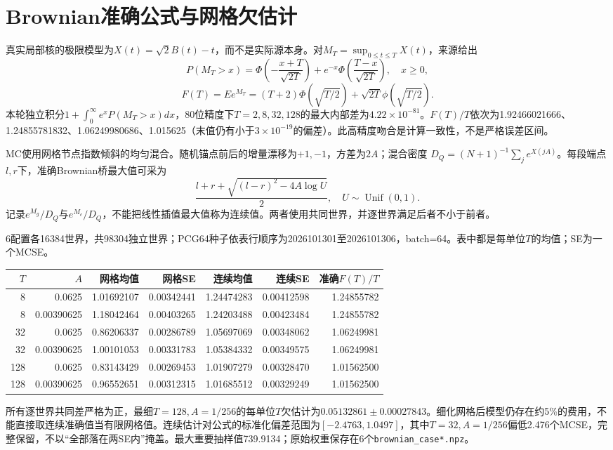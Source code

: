 \documentclass[UTF8,a4paper,11pt,fontset=none]{ctexart}
\begin{document}
\section{Brownian准确公式与网格欠估计}
真实局部核的极限模型为\(X(t)=\sqrt2B(t)-t\)，而不是实际源本身。对\(M_T=\sup_{0\le t\le T}X(t)\)，来源给出
\[
P(M_T>x)=\Phi\!\left(-\frac{x+T}{\sqrt{2T}}\right)
+e^{-x}\Phi\!\left(\frac{T-x}{\sqrt{2T}}\right),\quad x\ge0,
\]
\[
F(T)=Ee^{M_T}=(T+2)\Phi(\sqrt{T/2})+\sqrt{2T}\phi(\sqrt{T/2}).
\]
本轮独立积分\(1+\int_0^\infty e^xP(M_T>x)dx\)，80位精度下\(T=2,8,32,128\)的最大内部差为\(4.22\times10^{-81}\)。\(F(T)/T\)依次为1.92466021666、1.24855781832、1.06249980686、1.015625（末值仍有小于\(3\times10^{-19}\)的偏差）。此高精度吻合是计算一致性，不是严格误差区间。

MC使用网格节点指数倾斜的均匀混合。随机锚点前后的增量漂移为\(+1,-1\)，方差为\(2A\)；混合密度
\(D_Q=(N+1)^{-1}\sum_j e^{X(jA)}\)。每段端点\(l,r\)下，准确Brownian桥最大值可采为
\[
\frac{l+r+\sqrt{(l-r)^2-4A\log U}}2,\quad U\sim\operatorname{Unif}(0,1).
\]
记录\(e^{M_g}/D_Q\)与\(e^{M_c}/D_Q\)，不能把线性插值最大值称为连续值。两者使用共同世界，并逐世界满足后者不小于前者。

6配置各16384世界，共98304独立世界；PCG64种子依表行顺序为2026101301至2026101306，batch=64。表中都是每单位\(T\)的均值；SE为一个MCSE。
\begin{center}\scriptsize\setlength{\tabcolsep}{3pt}
\begin{tabular}{rrrrrrr}\toprule
\(T\)&\(A\)&网格均值&网格SE&连续均值&连续SE&准确\(F(T)/T\)\\\midrule
8 & 0.0625 & 1.01692107 & 0.00342441 & 1.24474283 & 0.00412598 & 1.24855782\\
8 & 0.00390625 & 1.18042464 & 0.00403265 & 1.24203488 & 0.00423484 & 1.24855782\\
32 & 0.0625 & 0.86206337 & 0.00286789 & 1.05697069 & 0.00348062 & 1.06249981\\
32 & 0.00390625 & 1.00101053 & 0.00331783 & 1.05384332 & 0.00349575 & 1.06249981\\
128 & 0.0625 & 0.83143429 & 0.00269453 & 1.01907279 & 0.00328470 & 1.01562500\\
128 & 0.00390625 & 0.96552651 & 0.00312315 & 1.01685512 & 0.00329249 & 1.01562500\\
\bottomrule\end{tabular}\end{center}
所有逐世界共同差严格为正，最细\(T=128,A=1/256\)的每单位\(T\)欠估计为\(0.05132861\pm0.00027843\)。细化网格后模型仍存在约5\%的费用，不能直接取连续准确值当有限网格值。连续估计对公式的标准化偏差范围为\([-2.4763,1.0497]\)，其中\(T=32,A=1/256\)偏低2.476个MCSE，完整保留，不以``全部落在两SE内''掩盖。最大重要抽样值739.9134；原始权重保存在6个\nolinkurl{brownian_case*.npz}。
\end{document}
